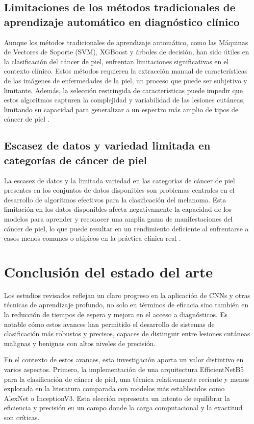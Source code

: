 \subsection*{Limitaciones de los métodos tradicionales de aprendizaje automático en diagnóstico clínico}
Aunque los métodos tradicionales de aprendizaje automático, como las Máquinas de Vectores de Soporte (SVM), XGBoost y árboles de decisión, han sido útiles en la clasificación del cáncer de piel, enfrentan limitaciones significativas en el contexto clínico. Estos métodos requieren la extracción manual de características de las imágenes de enfermedades de la piel, un proceso que puede ser subjetivo y limitante. Además, la selección restringida de características puede impedir que estos algoritmos capturen la complejidad y variabilidad de las lesiones cutáneas, limitando su capacidad para generalizar a un espectro más amplio de tipos de cáncer de piel .

\subsection*{Escasez de datos y variedad limitada en categorías de cáncer de piel}
La escasez de datos y la limitada variedad en las categorías de cáncer de piel presentes en los conjuntos de datos disponibles son problemas centrales en el desarrollo de algoritmos efectivos para la clasificación del melanoma. Esta limitación en los datos disponibles afecta negativamente la capacidad de los modelos para aprender y reconocer una amplia gama de manifestaciones del cáncer de piel, lo que puede resultar en un rendimiento deficiente al enfrentarse a casos menos comunes o atípicos en la práctica clínica real .

\section{Conclusión del estado del arte}

Los estudios revisados reflejan un claro progreso en la aplicación de CNNs y otras técnicas de aprendizaje profundo, no solo en términos de eficacia sino también en la reducción de tiempos de espera y mejora en el acceso a diagnósticos. Es notable cómo estos avances han permitido el desarrollo de sistemas de clasificación más robustos y precisos, capaces de distinguir entre lesiones cutáneas malignas y benignas con altos niveles de precisión.

En el contexto de estos avances, esta investigación aporta un valor distintivo en varios aspectos. Primero, la implementación de una arquitectura EfficientNetB5 para la clasificación de cáncer de piel, una técnica relativamente reciente y menos explorada en la literatura comparada con modelos más establecidos como AlexNet o InceptionV3. Esta elección representa un intento de equilibrar la eficiencia y precisión en un campo donde la carga computacional y la exactitud son críticas.

